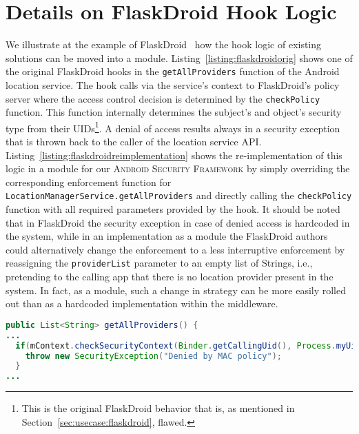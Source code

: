\documentclass[letterpaper,twocolumn,10pt]{article}
\newcommand{\OURNAME}{\textsc{Android Security Framework}\xspace}
\begin{document}
\section{Details on FlaskDroid Hook Logic}
\label{sec:flaskdroiddetail}

We illustrate at the example of FlaskDroid~\cite{TUD-CS-2013-0115} how the hook logic of existing solutions can be moved into a module. Listing~\ref{listing:flaskdroidorig} shows one of the original FlaskDroid hooks in the \texttt{getAllProviders} function of the Android location service. The hook calls via the service's context to FlaskDroid's policy server where the access control decision is determined by the \texttt{checkPolicy} function. This function internally determines the subject's and object's security type from their UIDs\footnote{This is the original FlaskDroid behavior that is, as mentioned in Section~\ref{sec:usecase:flaskdroid}, flawed.}. A denial of access results always in a security exception that is thrown back to the caller of the location service API. Listing~\ref{listing:flaskdroidreimplementation} shows the re-implementation of this logic in a module for our \OURNAME by simply overriding the corresponding enforcement function for \texttt{LocationManagerService.getAllProviders} and directly calling the \texttt{checkPolicy} function with all required parameters provided by the hook. It should be noted that in FlaskDroid the security exception in case of denied access is hardcoded in the system, while in an implementation as a module the FlaskDroid authors could alternatively change the enforcement to a less interruptive enforcement by reassigning the \texttt{providerList} parameter to an empty list of Strings, i.e., pretending to the calling app that there is no location provider present in the system. In fact, as a module, such a change in strategy can be more easily rolled out than as a hardcoded implementation within the middleware.

\begin{lstlisting}[language=Java,basicstyle=\footnotesize,caption={Original FlaskDroid hook in \texttt{com.android.server.LocationManagerService}},label={listing:flaskdroidorig},aboveskip=\medskipamount,belowskip=\medskipamount]
public List<String> getAllProviders() {
...
  if(mContext.checkSecurityContext(Binder.getCallingUid(), Process.myUid(), "locationService_c", "getAllProviders") != PackageManager.PERMISSION_GRANTED) {
    throw new SecurityException("Denied by MAC policy");
  }
...
\end{lstlisting}
\end{document}
